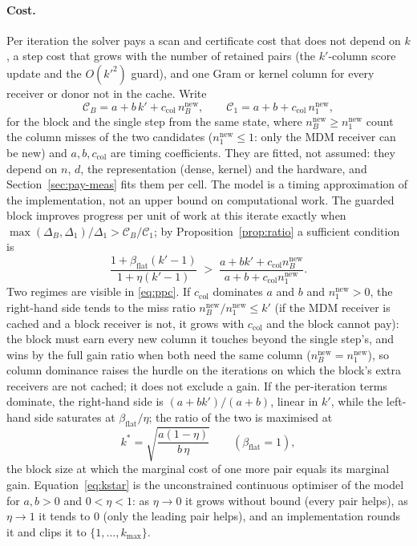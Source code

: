 \paragraph{Cost.} Per iteration the solver pays a scan and certificate
cost that does not depend on $k$, a step cost that grows with the number
of retained pairs (the $k'$-column score update and the $O(k'^2)$ guard), and one Gram or kernel column for every
receiver or donor not in the cache. Write
\[
\mathcal C_B=a+b\,k'+c_{\mathrm{col}}\,n^{\mathrm{new}}_B,\qquad \mathcal C_1=a+b+c_{\mathrm{col}}\,n^{\mathrm{new}}_1,
\]
for the block and the single step from the same state, where $n^{\mathrm{new}}_B\ge n^{\mathrm{new}}_1$
count the column misses of the two candidates ($n^{\mathrm{new}}_1\le1$: only the MDM
receiver can be new) and $a,b,c_{\mathrm{col}}$ are timing coefficients.
They are fitted, not assumed: they depend on $n$, $d$, the
representation (dense, kernel) and the hardware, and
Section~\ref{sec:pay-meas} fits them per cell. The model is a timing
approximation of the implementation, not an upper bound on
computational work. The guarded block improves progress per unit of work at this
iterate exactly when
$\max(\Delta_B,\Delta_1)/\Delta_1>\mathcal C_B/\mathcal C_1$; by
Proposition~\ref{prop:ratio} a sufficient condition is
\begin{equation}\label{eq:ppc}
\frac{1+\beta_{\mathrm{flat}}(k'-1)}{1+\eta(k'-1)}\;>\;\frac{a+bk'+c_{\mathrm{col}}n^{\mathrm{new}}_B}{a+b+c_{\mathrm{col}}n^{\mathrm{new}}_1}.
\end{equation}
Two regimes are visible in \eqref{eq:ppc}. If $c_{\mathrm{col}}$
dominates $a$ and $b$ and $n^{\mathrm{new}}_1>0$, the right-hand side tends to
the miss ratio $n^{\mathrm{new}}_B/n^{\mathrm{new}}_1\le k'$ (if the MDM
receiver is cached and a block receiver is not, it grows with
$c_{\mathrm{col}}$ and the block cannot pay): the block must earn every new column it
touches beyond the single step's, and wins by the full gain ratio when
both need the same column ($n^{\mathrm{new}}_B=n^{\mathrm{new}}_1$), so column dominance
raises the hurdle on the iterations on which the block's extra receivers
are not cached; it does not exclude a gain. If the per-iteration terms dominate, the
right-hand side is $(a+bk')/(a+b)$, linear in $k'$, while the left-hand
side saturates at $\beta_{\mathrm{flat}}/\eta$; the ratio of the two is maximised at
\begin{equation}\label{eq:kstar}
k^*=\sqrt{\frac{a(1-\eta)}{b\,\eta}}\qquad(\beta_{\mathrm{flat}}=1),
\end{equation}
the block size at which the marginal cost of one more pair equals its
marginal gain. Equation~\eqref{eq:kstar} is the unconstrained continuous
optimiser of the model for $a,b>0$ and $0<\eta<1$: as $\eta\to0$ it grows
without bound (every pair helps), as $\eta\to1$ it tends to $0$ (only the
leading pair helps), and an implementation rounds it and clips it to
$\{1,\dots,k_{\max}\}$.

